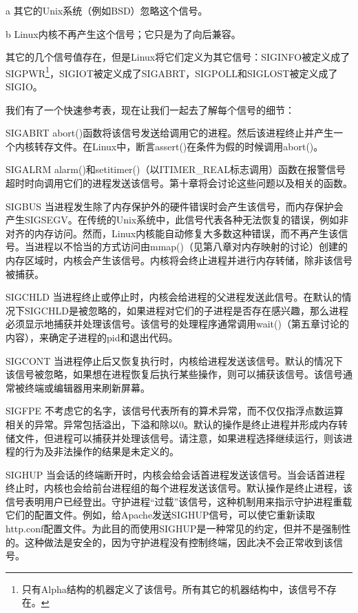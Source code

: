 a 其它的Unix系统（例如BSD）忽略这个信号。

b Linux内核不再产生这个信号；它只是为了向后兼容。

其它的几个信号值存在，但是Linux将它们定义为其它信号：SIGINFO被定义成了SIGPWR\footnote[1]{只有Alpha结构的机器定义了该信号。所有其它的机器结构中，该信号不存在。}，SIGIOT被定义成了SIGABRT，SIGPOLL和SIGLOST被定义成了SIGIO。

我们有了一个快速参考表，现在让我们一起去了解每个信号的细节：

\begin{eqlist*}
\item[SIGABRT] abort()函数将该信号发送给调用它的进程。然后该进程终止并产生一个内核转存文件。在Linux中，断言assert()在条件为假的时候调用abort()。
\item[SIGALRM] alarm()和setitimer()（以ITIMER\_REAL标志调用）函数在报警信号超时时向调用它们的进程发送该信号。第十章将会讨论这些问题以及相关的函数。
\item[SIGBUS] 当进程发生除了内存保护外的硬件错误时会产生该信号，而内存保护会产生SIGSEGV。在传统的Unix系统中，此信号代表各种无法恢复的错误，例如非对齐的内存访问。然而，Linux内核能自动修复大多数这种错误，而不再产生该信号。当进程以不恰当的方式访问由mmap()（见第八章对内存映射的讨论）创建的内存区域时，内核会产生该信号。内核将会终止进程并进行内存转储，除非该信号被捕获。
\item[SIGCHLD] 当进程终止或停止时，内核会给进程的父进程发送此信号。在默认的情况下SIGCHLD是被忽略的，如果进程对它们的子进程是否存在感兴趣，那么进程必须显示地捕获并处理该信号。该信号的处理程序通常调用wait()（第五章讨论的内容），来确定子进程的pid和退出代码。
\item[SIGCONT] 当进程停止后又恢复执行时，内核给进程发送该信号。默认的情况下该信号被忽略，如果想在进程恢复后执行某些操作，则可以捕获该信号。该信号通常被终端或编辑器用来刷新屏幕。
\item[SIGFPE] 不考虑它的名字，该信号代表所有的算术异常，而不仅仅指浮点数运算相关的异常。异常包括溢出，下溢和除以0。默认的操作是终止进程并形成内存转储文件，但进程可以捕获并处理该信号。请注意，如果进程选择继续运行，则该进程的行为及非法操作的结果是未定义的。
\item[SIGHUP] 当会话的终端断开时，内核会给会话首进程发送该信号。当会话首进程终止时，内核也会给前台进程组的每个进程发送该信号。默认操作是终止进程，该信号表明用户已经登出。守护进程“过载”该信号，这种机制用来指示守护进程重载它们的配置文件。例如，给Apache发送SIGHUP信号，可以使它重新读取http.conf配置文件。为此目的而使用SIGHUP是一种常见的约定，但并不是强制性的。这种做法是安全的，因为守护进程没有控制终端，因此决不会正常收到该信号。

\end{eqlist*}
